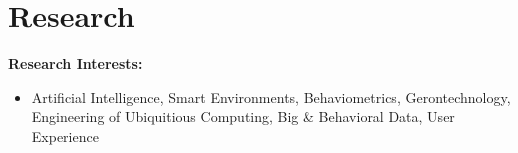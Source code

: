 \AOCLine
\section*{Research}

{\bf Research Interests:}
\begin{itemize}
	\item Artificial Intelligence, Smart Environments, Behaviometrics, Gerontechnology, Engineering of Ubiquitious Computing, Big \& Behavioral Data, User Experience


\end{itemize}
